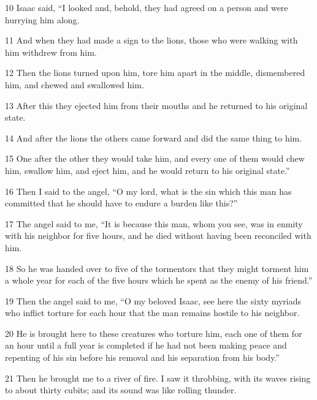 \par 10 Isaac said, “I looked and, behold, they had agreed on a person and were hurrying him along. 

\par 11 And when they had made a sign to the lions, those who were walking with him withdrew from him. 

\par 12 Then the lions turned upon him, tore him apart in the middle, dismembered him, and chewed and swallowed him. 

\par 13 After this they ejected him from their mouths and he returned to his original state. 

\par 14 And after the lions the others came forward and did the same thing to him. 

\par 15 One after the other they would take him, and every one of them would chew him, swallow him, and eject him, and he would return to his original state.” 

\par 16 Then I said to the angel, “O my lord, what is the sin which this man has committed that he should have to endure a burden like this?” 

\par 17 The angel said to me, “It is because this man, whom you see, was in enmity with his neighbor for five hours, and he died without having been reconciled with him. 

\par 18 So he was handed over to five of the tormentors that they might torment him a whole year for each of the five hours which he spent as the enemy of his friend.” 

\par 19 Then the angel said to me, “O my beloved Isaac, see here the sixty myriads who inflict torture for each hour that the man remains hostile to his neighbor. 

\par 20 He is brought here to these creatures who torture him, each one of them for an hour until a full year is completed if he had not been making peace and repenting of his sin before his removal and his separation from his body.” 

\par 21 Then he brought me to a river of fire. I saw it throbbing, with its waves rising to about thirty cubits; and its sound was like rolling thunder. 

